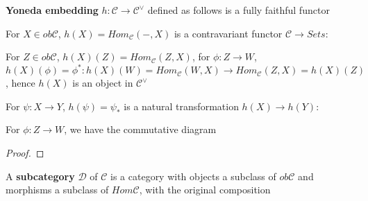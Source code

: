 \documentclass[../main.tex]{subfiles}
\begin{document}
\begin{lemma}\label{Yoneda lemma}
\textbf{Yoneda embedding} $h:\mathscr C\to\mathscr C^\vee$ defined as follows is a fully faithful functor \par
For $X\in ob\mathscr C$, $h(X)=Hom_{\mathscr C}(-,X)$ is a contravariant functor $\mathscr C\to Sets$: \par
For $Z\in ob\mathscr C$, $h(X)(Z)=Hom_{\mathscr C}(Z,X)$, for $\phi:Z\to W$, $h(X)(\phi)=\phi^*:h(X)(W)=Hom_{\mathscr C}(W,X)\to Hom_{\mathscr C}(Z,X)=h(X)(Z)$, hence $h(X)$ is an object in $\mathscr C^\vee$ \par
For $\psi:X\to Y$, $h(\psi)=\psi_*$ is a natural transformation $h(X)\to h(Y)$: \par
For $\phi:Z\to W$, we have the commutative diagram
\begin{center}
\end{center}
\end{lemma}

\begin{proof}

\end{proof}

\begin{definition}
A \textbf{subcategory} $\mathscr D$ of $\mathscr C$ is a category with objects a subclass of $ob\mathscr C$ and morphisms a subclass of $Hom\mathscr C$, with the original composition
\end{definition}
\end{document}
